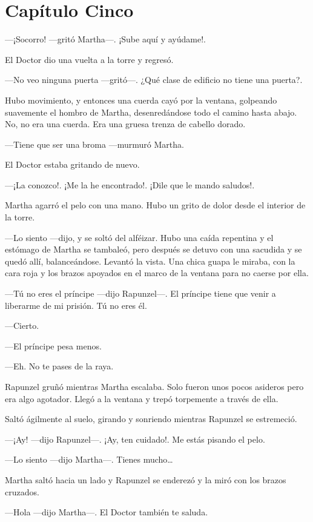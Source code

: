 \chapter*{Capítulo Cinco} 

---¡Socorro! ---gritó Martha---. ¡Sube aquí y ayúdame!.

El Doctor dio una vuelta a la torre y regresó.

---No veo ninguna puerta ---gritó---. ¿Qué clase de edificio no tiene una puerta?.

Hubo movimiento, y entonces una cuerda cayó por la ventana, golpeando suavemente el hombro de Martha, desenredándose todo el camino hasta abajo. No, no era una cuerda. Era una gruesa trenza de cabello dorado.

---Tiene que ser una broma ---murmuró Martha.

El Doctor estaba gritando de nuevo.

---¡La conozco!. ¡Me la he encontrado!. ¡Dile que le mando saludos!.

Martha agarró el pelo con una mano. Hubo un grito de dolor desde el interior de la torre.

---Lo siento ---dijo, y se soltó del alféizar. Hubo una caída repentina y el estómago de Martha se tambaleó, pero después se detuvo con una sacudida y se quedó allí, balanceándose. Levantó la vista. Una chica guapa le miraba, con la cara roja y los brazos apoyados en el marco de la ventana para no caerse por ella.

---Tú no eres el príncipe ---dijo Rapunzel---. El príncipe tiene que venir a liberarme de mi prisión. Tú no eres él.

---Cierto.

---El príncipe pesa menos.

---Eh. No te pases de la raya.

Rapunzel gruñó mientras Martha escalaba. Solo fueron unos pocos asideros pero era algo agotador. Llegó a la ventana y trepó torpemente a través de ella.

Saltó ágilmente al suelo, girando y sonriendo mientras Rapunzel se estremeció.

---¡Ay! ---dijo Rapunzel---. ¡Ay, ten cuidado!. Me estás pisando el pelo.

---Lo siento ---dijo Martha---. Tienes mucho\ldots{}

Martha saltó hacia un lado y Rapunzel se enderezó y la miró con los brazos cruzados.

---Hola ---dijo Martha---. El Doctor también te saluda.

